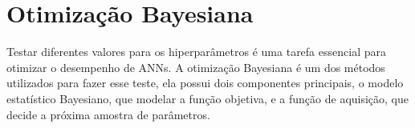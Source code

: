 \section{Otimização Bayesiana}
Testar diferentes valores para os hiperparâmetros é uma tarefa essencial para otimizar o desempenho de ANNs.
A otimização Bayesiana é um dos métodos utilizados para fazer esse teste, ela possui dois componentes principais,
o modelo estatístico Bayesiano, que modelar a função objetiva, e a função de aquisição, que decide a próxima amostra
de parâmetros. %

